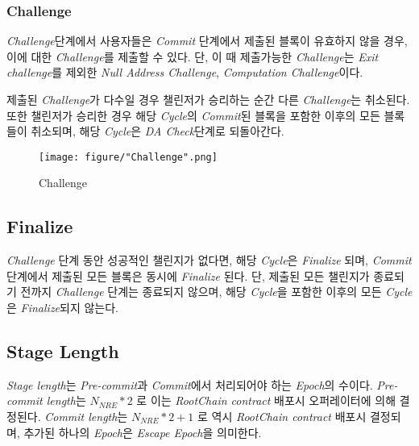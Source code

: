 \documentclass[letterpaper, 11pt]{article}
\begin{document}
\subsubsection{Challenge}
\begin{CJK}{UTF8}{mj}
\emph{Challenge}단계에서 사용자들은 \emph{Commit} 단계에서 제출된 블록이 유효하지 않을 경우, 이에 대한 \emph{Challenge}를 제출할 수 있다. 단, 이 때 제출가능한 \emph{Challenge}는 \emph{Exit challenge}를 제외한 \emph{Null Address Challenge}, \emph{Computation Challenge}이다.

제출된 \emph{Challenge}가 다수일 경우 챌린저가 승리하는 순간 다른 \emph{Challenge}는 취소된다. 또한 챌린저가 승리한 경우 해당 \emph{Cycle}의 \emph{Commit}된 블록을 포함한 이후의 모든 블록들이 취소되며, 해당 \emph{Cycle}은 \emph{DA Check}단계로 되돌아간다.


\begin{figure}[!h]
\centering
\texttt{[image: figure/"Challenge".png]}
\caption{Challenge}
\label{fig:challenge-block-sequence}
\end{figure}

\end{CJK}


\subsection{Finalize}
\begin{CJK}{UTF8}{mj}
\emph{Challenge} 단계 동안 성공적인 챌린지가 없다면, 해당 \emph{Cycle}은 \emph{Finalize} 되며, \emph{Commit} 단계에서 제출된 모든 블록은 동시에 \emph{Finalize} 된다. 단, 제출된 모든 챌린지가 종료되기 전까지 \emph{Challenge} 단계는 종료되지 않으며, 해당 \emph{Cycle}을 포함한 이후의 모든 \emph{Cycle}은 \emph{Finalize}되지 않는다.
\end{CJK}

\subsection{Stage Length}
\begin{CJK}{UTF8}{mj}
\emph{Stage length}는 \emph{Pre-commit}과 \emph{Commit}에서 처리되어야 하는 \emph{Epoch}의 수이다. \emph{Pre-commit length}는 $N_{NRE} * 2$ 로 이는 \emph{RootChain contract} 배포시 오퍼레이터에 의해 결정된다. \emph{Commit length}는 $N_{NRE} * 2 + 1$ 로 역시 \emph{RootChain contract} 배포시 결정되며, 추가된 하나의 \emph{Epoch}은 \emph{Escape Epoch}을 의미한다.
\end{CJK}
\end{document}
